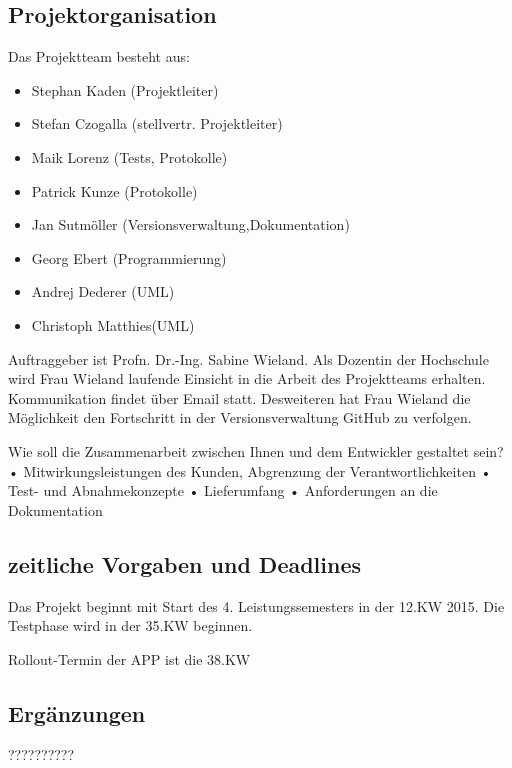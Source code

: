 \subsection{Projektorganisation}

Das Projektteam besteht aus: 

	\begin{itemize}
		\item Stephan Kaden		(Projektleiter) 
		\item Stefan Czogalla 	(stellvertr. Projektleiter)
		\item Maik Lorenz		(Tests, Protokolle)
		\item Patrick Kunze		(Protokolle)
		\item Jan Sutmöller		(Versionsverwaltung,Dokumentation)
		\item Georg Ebert		(Programmierung)
		\item Andrej Dederer	(UML)
		\item Christoph Matthies(UML)
	\end{itemize}
	
	
Auftraggeber ist Profn. Dr.-Ing. Sabine Wieland. Als Dozentin der Hochschule wird Frau Wieland laufende Einsicht in die Arbeit des Projektteams erhalten. Kommunikation findet über Email statt. Desweiteren hat Frau Wieland die Möglichkeit den Fortschritt in der Versionsverwaltung GitHub zu verfolgen.

Wie soll die Zusammenarbeit zwischen Ihnen und dem Entwickler gestaltet sein? 
•	Mitwirkungsleistungen des Kunden, Abgrenzung der Verantwortlichkeiten
•	Test- und Abnahmekonzepte
•	Lieferumfang
•	Anforderungen an die Dokumentation

\subsection{zeitliche Vorgaben und Deadlines}

Das Projekt beginnt mit Start des 4. Leistungssemesters in der 12.KW 2015.
Die Testphase wird in der 35.KW beginnen.

Rollout-Termin der APP ist die 38.KW 

\subsection{Ergänzungen}

??????????